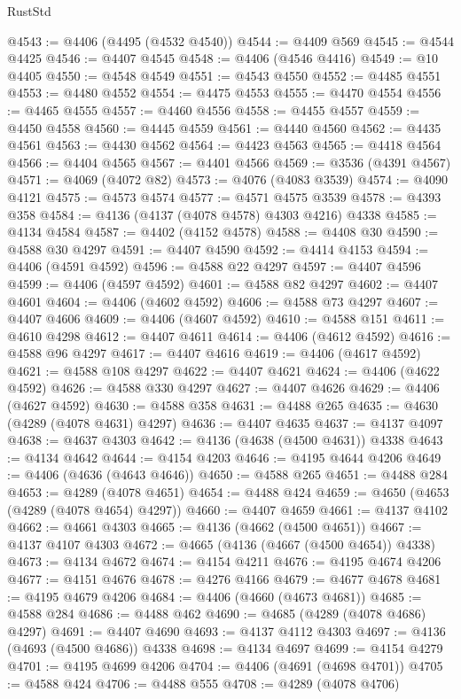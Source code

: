 \begin{lexlean}{RustStd}
\begin{coremodule}
{\begin{coremodule}
{{{{{{{{{{{{{{{{{{{{{{{{{{{{{{{{{{{{{{{{{{{{{{{{{{@4543 := @4406 (@4495 (@4532 @4540))
@4544 := @4409 @569
@4545 := @4544 @4425
@4546 := @4407 @4545
@4548 := @4406 (@4546 @4416)
@4549 := @10 @4405
@4550 := @4548 @4549
@4551 := @4543 @4550
@4552 := @4485 @4551
@4553 := @4480 @4552
@4554 := @4475 @4553
@4555 := @4470 @4554
@4556 := @4465 @4555
@4557 := @4460 @4556
@4558 := @4455 @4557
@4559 := @4450 @4558
@4560 := @4445 @4559
@4561 := @4440 @4560
@4562 := @4435 @4561
@4563 := @4430 @4562
@4564 := @4423 @4563
@4565 := @4418 @4564
@4566 := @4404 @4565
@4567 := @4401 @4566
@4569 := @3536 (@4391 @4567)
@4571 := @4069 (@4072 @82)
@4573 := @4076 (@4083 @3539)
@4574 := @4090 @4121
@4575 := @4573 @4574
@4577 := @4571 @4575 @3539
@4578 := @4393 @358
@4584 := @4136 (@4137 (@4078 @4578) @4303 @4216) @4338
@4585 := @4134 @4584
@4587 := @4402 (@4152 @4578)
@4588 := @4408 @30
@4590 := @4588 @30 @4297
@4591 := @4407 @4590
@4592 := @4414 @4153
@4594 := @4406 (@4591 @4592)
@4596 := @4588 @22 @4297
@4597 := @4407 @4596
@4599 := @4406 (@4597 @4592)
@4601 := @4588 @82 @4297
@4602 := @4407 @4601
@4604 := @4406 (@4602 @4592)
@4606 := @4588 @73 @4297
@4607 := @4407 @4606
@4609 := @4406 (@4607 @4592)
@4610 := @4588 @151
@4611 := @4610 @4298
@4612 := @4407 @4611
@4614 := @4406 (@4612 @4592)
@4616 := @4588 @96 @4297
@4617 := @4407 @4616
@4619 := @4406 (@4617 @4592)
@4621 := @4588 @108 @4297
@4622 := @4407 @4621
@4624 := @4406 (@4622 @4592)
@4626 := @4588 @330 @4297
@4627 := @4407 @4626
@4629 := @4406 (@4627 @4592)
@4630 := @4588 @358
@4631 := @4488 @265
@4635 := @4630 (@4289 (@4078 @4631) @4297)
@4636 := @4407 @4635
@4637 := @4137 @4097
@4638 := @4637 @4303
@4642 := @4136 (@4638 (@4500 @4631)) @4338
@4643 := @4134 @4642
@4644 := @4154 @4203
@4646 := @4195 @4644 @4206
@4649 := @4406 (@4636 (@4643 @4646))
@4650 := @4588 @265
@4651 := @4488 @284
@4653 := @4289 (@4078 @4651)
@4654 := @4488 @424
@4659 := @4650 (@4653 (@4289 (@4078 @4654) @4297))
@4660 := @4407 @4659
@4661 := @4137 @4102
@4662 := @4661 @4303
@4665 := @4136 (@4662 (@4500 @4651))
@4667 := @4137 @4107 @4303
@4672 := @4665 (@4136 (@4667 (@4500 @4654)) @4338)
@4673 := @4134 @4672
@4674 := @4154 @4211
@4676 := @4195 @4674 @4206
@4677 := @4151 @4676
@4678 := @4276 @4166
@4679 := @4677 @4678
@4681 := @4195 @4679 @4206
@4684 := @4406 (@4660 (@4673 @4681))
@4685 := @4588 @284
@4686 := @4488 @462
@4690 := @4685 (@4289 (@4078 @4686) @4297)
@4691 := @4407 @4690
@4693 := @4137 @4112 @4303
@4697 := @4136 (@4693 (@4500 @4686)) @4338
@4698 := @4134 @4697
@4699 := @4154 @4279
@4701 := @4195 @4699 @4206
@4704 := @4406 (@4691 (@4698 @4701))
@4705 := @4588 @424
@4706 := @4488 @555
@4708 := @4289 (@4078 @4706)
}}}}}}}}}}}}}}}}}}}}}}}}}}}}}}}}}}}}}}}}}}}}}}}}}}
\end{coremodule}}
\end{coremodule}
\end{lexlean}
